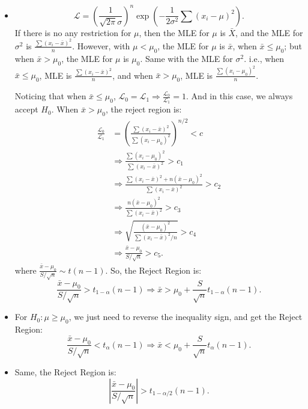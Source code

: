 \begin{solution}
    \begin{itemize}
        \item \[
            \mathcal{L}=\left(\frac{1}{\sqrt{2\pi}\sigma}\right)^n \exp\left(-\frac{1}{2\sigma^2}\sum\left(x_i-\mu\right)^2\right). 
        \]
        If there is no any restriction for $\mu$, then the MLE for $\mu$ is $\bar{X}$, and the MLE for $\sigma^2$ is $\frac{\sum(x_i-\bar{x})^2}{n}$. However, with $\mu<\mu_0$, the MLE for $\mu$ is $\bar{x}$, when $\bar{x}\leqslant\mu_0$; but when $\bar{x}>\mu_0$, the MLE for $\mu$ is $\mu_0$. Same with the MLE for $\sigma^2$. i.e., when $\bar{x}\leqslant\mu_0$, MLE is $\frac{\sum(x_i-\bar{x})^2}{n}$, and when $\bar{x}>\mu_0$, MLE is $\frac{\sum(x_i-\mu_0)^2}{n}$. 

        Noticing that when $\bar{x}\leqslant\mu_0$, $\mathcal{L}_0=\mathcal{L}_1\Rightarrow\frac{\mathcal{L}_0}{\mathcal{L}_1}=1$. And in this case, we always accept $H_0$. When $\bar{x}>\mu_0$, the reject region is: 
        \begin{align*}
            \frac{\mathcal{L}_0}{\mathcal{L}_1}&=\left(\frac{\sum(x_i-\bar{x})^2}{\sum(x_i-\mu_0)^2}\right)^{n/2}<c\\
            &\Rightarrow  \frac{\sum(x_i-\mu_0)^2}{\sum(x_i-\bar{x})^2}>c_1\\
            &\Rightarrow  \frac{\sum(x_i-\bar{x})^2+n(\bar{x}-\mu_0)^2}{\sum(x_i-\bar{x})^2}>c_2\\
            &\Rightarrow  \frac{n(\bar{x}-\mu_0)^2}{\sum(x_i-\bar{x})^2}>c_3\\
            &\Rightarrow  \sqrt{\frac{(\bar{x}-\mu_0)^2}{\sum(x_i-\bar{x})^2/n}}>c_4\\
            &\Rightarrow  \frac{\bar{x}-\mu_0}{S/\sqrt{n}}>c_5. 
        \end{align*}
        where $\frac{\bar{x}-\mu_0}{S/\sqrt{n}}\sim t(n-1)$. 
        So, the Reject Region is:
        \[
            \frac{\bar{x}-\mu_0}{S/\sqrt{n}}>t_{1-\alpha}(n-1)\Rightarrow\bar{x}>\mu_0+\frac{S}{\sqrt{n}} t_{1-\alpha}(n-1). 
        \]
        \item For $H_0: \mu\geqslant \mu_0$, we just need to reverse the inequality sign, and get the Reject Region:
        \[
            \frac{\bar{x}-\mu_0}{S/\sqrt{n}}<t_{\alpha}(n-1)\Rightarrow\bar{x}<\mu_0+\frac{S}{\sqrt{n}} t_{\alpha}(n-1). 
        \]
        \item Same, the Reject Region is: 
        \[
            \left|\frac{\bar{x}-\mu_0}{S/\sqrt{n}}\right|>t_{1-\alpha/2}(n-1). 
        \]
    \end{itemize}
\end{solution}

